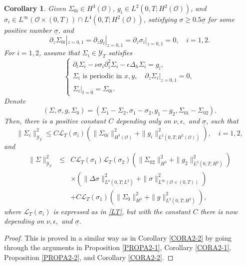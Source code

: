 \documentclass[12pt,reqno]{amsart}
\numberwithin{equation}{section}
\newtheorem{corollary}[theorem]{Corollary}
\begin{document}
\begin{corollary}
  \label{CORA2-3}
  Given $\Sigma_{0i}\in H^3(\mathcal O)$, $g_i\in L^2(0,T; H^2(\mathcal O))$, and $\sigma_i\in L^\infty(\mathcal O\times(0,T))\cap L^4(0,T; H^2(\mathcal O))$, satisfying $\sigma\geq0.5\underline\sigma$ for some positive number $\underline\sigma$, and
\begin{equation*}
\partial_z\Sigma_{0i}|_{z=0,1}=\partial_zg_i|_{z=0,1}=\partial_z\sigma_i|_{z=0,1}=0,\quad i=1,2.
\end{equation*}
For $i=1,2$, assume that $\Sigma_i\in\mathscr{Y}_T$ satisfies
  \begin{equation*}
    \left\{
    \begin{array}{l}\partial_t\Sigma_i-\nu\sigma_i\partial_z^2\Sigma_i-\epsilon\Delta_h\Sigma_i=g_i,\\
    \Sigma_i \text{ is  periodic in }x,y,\quad \partial_z\Sigma_i|_{z=0,1}=0,\\
    \Sigma_i|_{t=0}=\Sigma_{0i}.\nonumber
    \end{array}
    \right.
  \end{equation*}
Denote
$$
(\Sigma,\sigma,g,\Sigma_0)=(\Sigma_1-\Sigma_2, \sigma_1-\sigma_2, g_1-g_2, \Sigma_{01}-\Sigma_{02}).
$$
Then, there is a positive constant $C$ depending only on $\nu, \epsilon,$ and $\underline\sigma$, such that
  \begin{equation*}
 \|\Sigma_i\|_{\mathscr{Y}_T}^2
 \leq C\mathcal L_T(\sigma_i)\left(\|\Sigma_{0i}\|_{H^3(\mathcal O)}^2+\|g_i\|_{L^2(0,T;H^2(\mathcal O))}^2\right),\quad i=1,2,
\end{equation*}
and
\begin{eqnarray*}
\|\Sigma\|_{\mathscr Y_T}^2
&\leq& C\mathcal L_T(\sigma_1)\mathcal L_T(\sigma_2)\left(\|\Sigma_{02}\|_{H^3}^2+ \|g_2\|_{L^2(0,T;H^2)}^2\right) \\
&&\times \left(\|\Delta\sigma\|_{L^4(0,T;L^2)}^2+\|\sigma\|_{ L^\infty(\mathcal O\times(0,T))}^2\right)\\
  &&+C\mathcal L_T(\sigma_1)\left(\|\Sigma_0\|_{H^3}^2+ \|g\|_{L^2(0,T;H^2)}^2\right),
\end{eqnarray*}
where $\mathcal L_T(\sigma_i)$ is expressed as in \eqref{LT}, but with the constant $C$ there is now depending on $\nu, \epsilon,$ and $\underline\sigma$.
\end{corollary}

\begin{proof}
  This is proved in a similar way as in Corollary \ref{CORA2-2} by going through the arguments in Proposition \ref{PROPA2-1}, Corollary \ref{CORA2-1}, Proposition \ref{PROPA2-2}, and Corollary \ref{CORA2-2}.
\end{proof}
\end{document}
